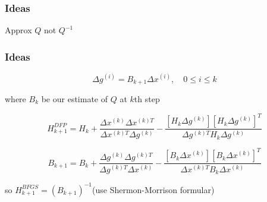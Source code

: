 \begin{frame}
	\frametitle{Ideas}
	
	Approx $Q$ not $Q^{-1}$
\end{frame}

\begin{frame}
	\frametitle{Ideas}
	
	$$\Delta g^{(i)} = B_{k+1}\Delta x^{(i)}, \quad 0 \leq i \leq k$$
	
	where $B_k$ be our estimate of $Q$ at $k$th step
\end{frame}

\begin{frame}
	$$H^{DFP}_{k+1} = H_k + \dfrac{\Delta x^{(k)}\Delta x^{(k)T}}{\Delta x^{(k)T}\Delta g^{(k)}} - \dfrac{[H_k\Delta g^{(k)}][H_k \Delta g^{(k)}]^T}{\Delta g^{(k)T}H_k\Delta g^{(k)}}$$
	
	$$B_{k+1} = B_k + \dfrac{\Delta g^{(k)}\Delta g^{(k)T}}{\Delta g^{(k)T}\Delta x^{(k)}} - \dfrac{[B_k\Delta x^{(k)}][B_k \Delta x^{(k)}]^T}{\Delta x^{(k)T}B_k\Delta x^{(k)}}$$
	
	so $H^{BFGS}_{k+1} = (B_{k+1})^{-1}$(use Shermon-Morrison formular)
\end{frame}



